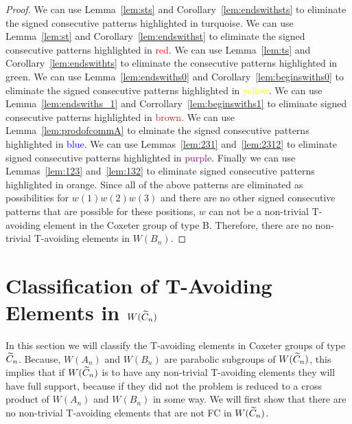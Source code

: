 \begin{proof}
We can use Lemma~\ref{lem:sts} and Corollary~\ref{lem:endswithsts} to eliminate the signed consecutive patterns highlighted in \textcolor{turq}{turquoise}. We can use Lemma~\ref{lem:st} and Corollary~\ref{lem:endswithst} to eliminate the signed consecutive patterns highlighted in \textcolor{red}{red}. We can use Lemma~\ref{lem:ts} and Corollary~\ref{lem:endswithts} to eliminate the consecutive patterns highlighted in \textcolor{ggreen}{green}.  We can use Lemma~\ref{lem:endswiths0} and Corollary~\ref{lem:beginswiths0} to eliminate the signed consecutive patterns highlighted in \textcolor{yellow}{yellow}. We can use Lemma~\ref{lem:endswiths_1} and Corrollary~\ref{lem:beginswiths1} to eliminate signed consecutive patterns highlighted in \textcolor{brown}{brown}. We can use Lemma~\ref{lem:prodofcommA} to elminate the signed consecutive patterns highlighted in \textcolor{blue}{blue}. We can use Lemmas~\ref{lem:231} and~\ref{lem:2312} to eliminate signed consecutive patterns highlighted in \textcolor{purple}{purple}. Finally we can use Lemmas~\ref{lem:123} and~\ref{lem:132} to eliminate signed consecutive patterns highlighted in \textcolor{orange2}{orange}. Since all of the above patterns are eliminated as possibilities for $w(1)w(2)w(3)$ and there are no other signed consecutive patterns that are possible for these positions, $w$ can not be a non-trivial T-avoiding element in the Coxeter group of type B. Therefore, there are no non-trivial T-avoiding elements in $W(B_n)$.
\end{proof}

\section{Classification of T-Avoiding Elements in $W(\widetilde{C}_n)$}

In this section we will classify the T-avoiding elements in Coxeter groups of type $\widetilde{C}_n$. Because, $W(A_n)$ and $W(B_n)$ are parabolic subgroups of $W(\widetilde{C}_n)$, this implies that if $W(\widetilde{C}_n)$ is to have any non-trivial T-avoiding elements they will have full support, because if they did not the problem is reduced to a cross product of $W(A_n)$ and $W(B_n)$ in some way. We will first show that there are no non-trivial T-avoiding elements that are not FC in $W(\widetilde{C}_n)$.

